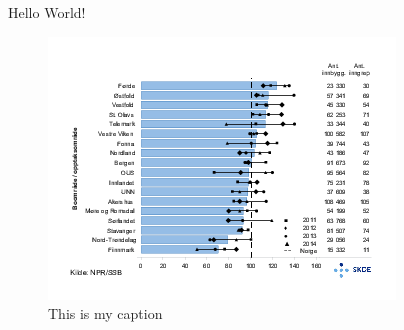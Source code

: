\documentclass{article}
\begin{document}
Hello World!


\begin{figure}[h]
\includegraphics{fig.png}
\caption{This is my caption}
\end{figure}
\end{document}

